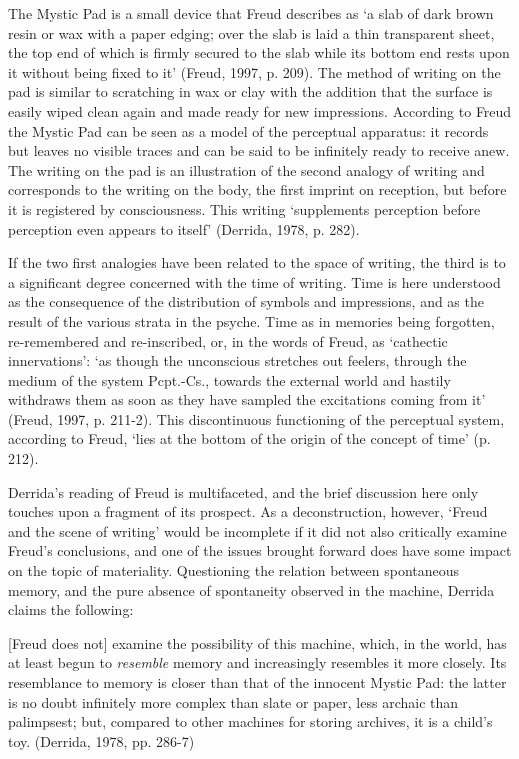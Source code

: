 The Mystic Pad is a small device that Freud describes as `a slab of dark
brown resin or wax with a paper edging; over the slab is laid a thin
transparent sheet, the top end of which is firmly secured to the slab
while its bottom end rests upon it without being fixed to it' (Freud,
1997, p. 209). The method of writing on the pad is similar to scratching
in wax or clay with the addition that the surface is easily wiped clean
again and made ready for new impressions. According to Freud the Mystic
Pad can be seen as a model of the perceptual apparatus: it records but
leaves no visible traces and can be said to be infinitely ready to
receive anew. The writing on the pad is an illustration of the second
analogy of writing and corresponds to the writing on the body, the first
imprint on reception, but before it is registered by consciousness. This
writing `supplements perception before perception even appears to
itself' (Derrida, 1978, p. 282).

If the two first analogies have been related to the space of writing,
the third is to a significant degree concerned with the time of writing.
Time is here understood as the consequence of the distribution of
symbols and impressions, and as the result of the various strata in the
psyche. Time as in memories being forgotten, re-remembered and
re-inscribed, or, in the words of Freud, as `cathectic innervations':
`as though the unconscious stretches out feelers, through the medium of
the system Pcpt.-Cs., towards the external world and hastily withdraws
them as soon as they have sampled the excitations coming from it'
(Freud, 1997, p. 211-2). This discontinuous functioning of the
perceptual system, according to Freud, `lies at the bottom of the origin
of the concept of time' (p. 212).

Derrida's reading of Freud is multifaceted, and the brief discussion
here only touches upon a fragment of its prospect. As a deconstruction,
however, `Freud and the scene of writing' would be incomplete if it did
not also critically examine Freud's conclusions, and one of the issues
brought forward does have some impact on the topic of materiality.
Questioning the relation between spontaneous memory, and the pure
absence of spontaneity observed in the machine, Derrida claims the
following:

{[}Freud does not{]} examine the possibility of this machine, which, in
the world, has at least begun to \emph{resemble} memory and increasingly
resembles it more closely. Its resemblance to memory is closer than that
of the innocent Mystic Pad: the latter is no doubt infinitely more
complex than slate or paper, less archaic than palimpsest; but, compared
to other machines for storing archives, it is a child's toy. (Derrida,
1978, pp. 286-7)

